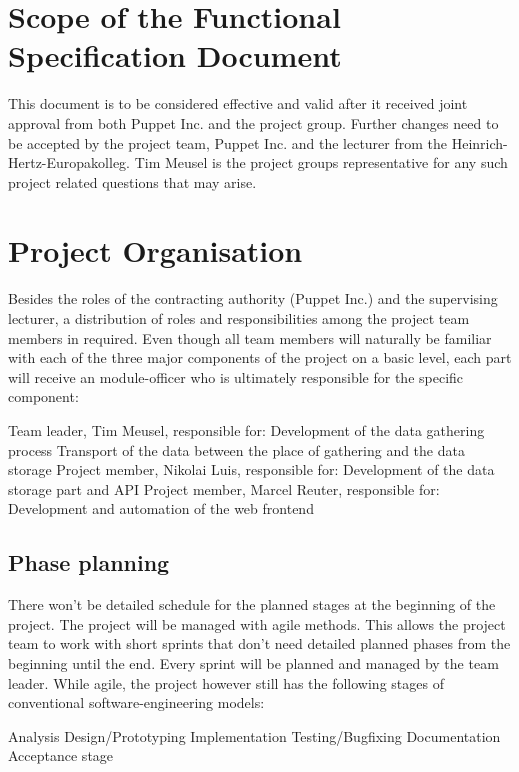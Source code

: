 \section{Scope of the Functional Specification Document}

This document is to be considered effective and valid after it received joint
approval from both Puppet Inc. and the project group. Further changes need to be
accepted by the project team, Puppet Inc. and the lecturer from the
Heinrich-Hertz-Europakolleg. Tim Meusel is the project groups representative for
any such project related questions that may arise.

\section{Project Organisation}

Besides the roles of the contracting authority (Puppet Inc.) and the supervising
lecturer, a distribution of roles and responsibilities among the project team
members in required. Even though all team members will naturally be familiar
with each of the three major components of the project on a basic level, each
part will receive an module-officer who is ultimately responsible for the
specific component:
\begin{outline}
    \1 Team leader, Tim Meusel, responsible for:
        \2 Development of the data gathering process
        \2 Transport of the data between the place of gathering and the data storage
    \1 Project member, Nikolai Luis, responsible for:
        \2 Development of the data storage part and API
    \1 Project member, Marcel Reuter, responsible for:
        \2 Development and automation of the web frontend
\end{outline}

\subsection{Phase planning}

There won’t be detailed schedule for the planned stages at the beginning of the
project. The project will be managed with agile methods. This allows the project
team to work with short sprints that don’t need detailed planned phases from the
beginning until the end. Every sprint will be planned and managed by the team
leader. While agile, the project however still has the following stages of
conventional software-engineering models:
\begin{outline}
    \1 Analysis
    \1 Design/Prototyping
    \1 Implementation
    \1 Testing/Bugfixing
    \1 Documentation
    \1 Acceptance stage
\end{outline}

